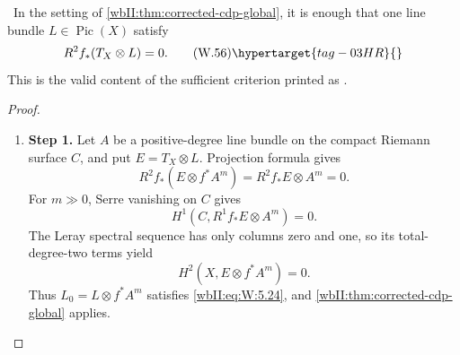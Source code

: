 \begin{corollary}\hypertarget{tag-03DT}{}\label{wbII:cor:corrected-cdp-relative}
\label{wbII:cor:relative}
\ In the setting of
\cref{wbII:thm:corrected-cdp-global}, it is enough that one line bundle
\(L\in\operatorname{Pic}(X)\) satisfy
\[
 R^2f_*(T_X\otimes L)=0.
\tag{W.56}\hypertarget{tag-03HR}{}\label{wbII:eq:W:5.29}
\]
This is the valid content of the sufficient criterion printed as
\cite[Proposition~2.4, p.~680]{CDP20}.
\end{corollary}



\begin{proof}
\begin{enumerate}[label={$\langle1\rangle$\arabic*.},leftmargin=*]
\item 
\noindent\textbf{Step 1.} Let \(A\) be a positive-degree line bundle on the compact Riemann surface
\(C\), and put \(E=T_X\otimes L\).  Projection formula gives
\[
 R^2f_*(E\otimes f^*A^m)=R^2f_*E\otimes A^m=0.
\]
For \(m\gg0\), Serre vanishing on \(C\) gives
\[
 H^1(C,R^1f_*E\otimes A^m)=0.
\]
The Leray spectral sequence has only columns zero and one, so its
total-degree-two terms yield
\[
 H^2(X,E\otimes f^*A^m)=0.
\]
Thus \(L_0=L\otimes f^*A^m\) satisfies \eqref{wbII:eq:W:5.24}, and
\cref{wbII:thm:corrected-cdp-global} applies.

\end{enumerate}
\end{proof}